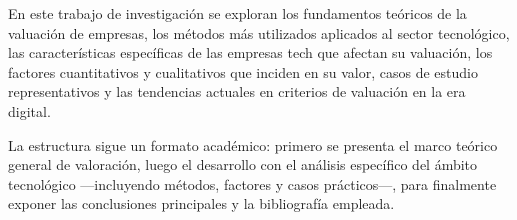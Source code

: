 En este trabajo de investigación se exploran los fundamentos teóricos de la valuación de empresas, los métodos más utilizados aplicados al sector tecnológico, las características específicas de las empresas tech que afectan su valuación, los factores cuantitativos y cualitativos que inciden en su valor, casos de estudio representativos y las tendencias actuales en criterios de valuación en la era digital.

La estructura sigue un formato académico: primero se presenta el marco teórico general de valoración, luego el desarrollo con el análisis específico del ámbito tecnológico ---incluyendo métodos, factores y casos prácticos---, para finalmente exponer las conclusiones principales y la bibliografía empleada. 